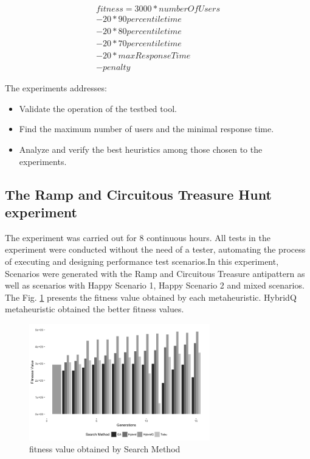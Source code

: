 \begin{equation}
\begin{aligned}
fitness=3000*numberOfUsers\\
-20* 90percentiletime\\
-20*80percentiletime\\
-20*70percentiletime\\
-20*maxResponseTime\\
-penalty
\end{aligned}
\end{equation}

The experiments addresses:

\begin{itemize}
\item Validate the operation of the testbed tool.
\item Find the maximum number of users and the minimal response time.
\item Analyze and verify the best heuristics among those chosen to the experiments.
\end{itemize}


\subsection{The Ramp and Circuitous Treasure Hunt experiment}

The experiment was carried out for 8 continuous hours.  All tests in the experiment were conducted without the need of a tester, automating the process of executing and designing performance test scenarios.In this experiment, Scenarios were generated with the Ramp and Circuitous Treasure antipattern as well as scenarios with Happy Scenario 1, Happy Scenario 2 and mixed scenarios. The Fig. \ref{fig:fitnessbygeneration1}  presents the fitness value obtained by each metaheuristic. HybridQ metaheuristic obtained the better fitness values. 


\begin{figure}[H]

\centering
\includegraphics[width=0.7\textwidth]{./images/experiment1-1.png}
\caption{fitness value obtained by Search Method }
\label{fig:fitnessbygeneration1}
\end{figure}




